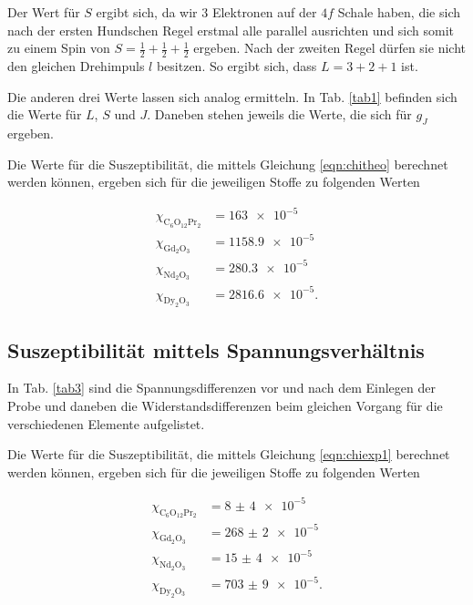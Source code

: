 \noindent Der Wert für $S$ ergibt sich, da wir \num{3} Elektronen auf der $4f$ Schale haben, die sich nach der ersten Hundschen Regel erstmal alle parallel ausrichten und sich somit zu einem Spin von $S = \frac{1}{2}+ \frac{1}{2} + \frac{1}{2}$ ergeben. Nach der zweiten Regel dürfen sie nicht den gleichen Drehimpuls $l$ besitzen. So ergibt sich, dass $L = 3 + 2 + 1$ ist. 

\noindent Die anderen drei Werte lassen sich analog ermitteln. 
In Tab. \ref{tab1} befinden sich die Werte für $L$, $S$ und $J$. Daneben stehen jeweils die Werte, die sich für 
$g_J$ ergeben. 


\noindent Die Werte für die Suszeptibilität, die mittels Gleichung \eqref{eqn:chitheo} berechnet werden können, ergeben sich für die jeweiligen Stoffe 
zu folgenden Werten 

\begin{align*}
   \chi_{\text{C}_6 \text{O}_{12} \text{Pr}_2} &= \num{163e-5}\\ %
   \chi_{\text{Gd}_2 \text{O}_3} &= \num{1158.9e-5}\\
   \chi_{\text{Nd}_2 \text{O}_3} &= \num{280.3e-5}\\
   \chi_{\text{Dy}_2 \text{O}_3} &= \num{2816.6e-5}.
\end{align*}

\subsection{Suszeptibilität mittels Spannungsverhältnis}
In Tab. \ref{tab3} sind die Spannungsdifferenzen vor und nach dem Einlegen der Probe und daneben die Widerstandsdifferenzen beim gleichen Vorgang für die verschiedenen Elemente aufgelistet.


\noindent Die Werte für die Suszeptibilität, die mittels Gleichung \eqref{eqn:chiexp1} berechnet werden können, ergeben sich für die jeweiligen Stoffe 
zu folgenden Werten 

\begin{align*} 
   \chi_{\text{C}_6 \text{O}_{12} \text{Pr}_2} &= \num{8(4)e-5}\\ %
   \chi_{\text{Gd}_2 \text{O}_3} &= \num{268(2)e-5}\\
   \chi_{\text{Nd}_2 \text{O}_3} &= \num{15(4)e-5}\\
   \chi_{\text{Dy}_2 \text{O}_3} &= \num{703(9)e-5}.
\end{align*}



